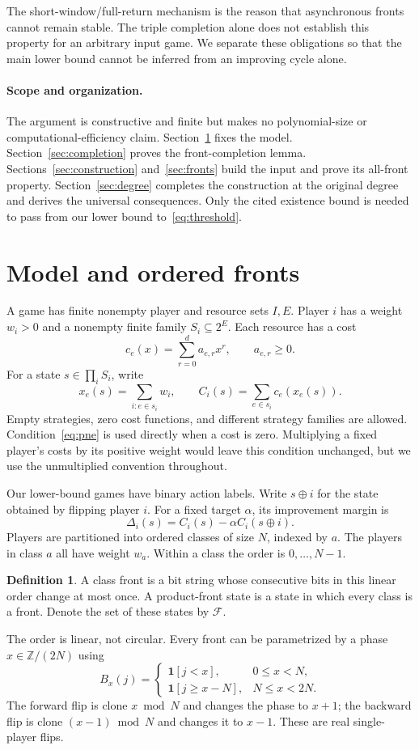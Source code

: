 \documentclass[11pt]{article}
\theoremstyle{definition}
\newtheorem{definition}[theorem]{Definition}
\theoremstyle{remark}
\newcommand{\F}{\mathcal F}
\newcommand{\ind}{\mathbf 1}
\newcommand{\xor}{\mathbin{\oplus}}
\begin{document}
The short-window/full-return mechanism is the reason that asynchronous fronts cannot remain stable. The triple completion alone does not establish this property for an arbitrary input game. We separate these obligations so that the main lower bound cannot be inferred from an improving cycle alone.

\paragraph{Scope and organization.}
The argument is constructive and finite but makes no polynomial-size or computational-efficiency claim. Section~\ref{sec:model} fixes the model. Section~\ref{sec:completion} proves the front-completion lemma. Sections~\ref{sec:construction} and~\ref{sec:fronts} build the input and prove its all-front property. Section~\ref{sec:degree} completes the construction at the original degree and derives the universal consequences. Only the cited existence bound is needed to pass from our lower bound to~\eqref{eq:threshold}.

\section{Model and ordered fronts}\label{sec:model}
A game has finite nonempty player and resource sets $I,E$. Player $i$ has a weight $w_i>0$ and a nonempty finite family $S_i\subseteq2^E$. Each resource has a cost
\[
 c_e(x)=\sum_{r=0}^d a_{e,r}x^r,\qquad a_{e,r}\ge0.
\]
For a state $s\in\prod_iS_i$, write
\[
 x_e(s)=\sum_{i:e\in s_i}w_i,
 \qquad C_i(s)=\sum_{e\in s_i}c_e(x_e(s)).
\]
Empty strategies, zero cost functions, and different strategy families are allowed. Condition~\eqref{eq:pne} is used directly when a cost is zero. Multiplying a fixed player's costs by its positive weight would leave this condition unchanged, but we use the unmultiplied convention throughout.

Our lower-bound games have binary action labels. Write $s\xor i$ for the state obtained by flipping player $i$. For a fixed target $\alpha$, its improvement margin is
\[
 \Delta_i(s)=C_i(s)-\alpha C_i(s\xor i).
\]
Players are partitioned into ordered classes of size $N$, indexed by $a$. The players in class $a$ all have weight $w_a$. Within a class the order is $0,\ldots,N-1$.

\begin{definition}
A class front is a bit string whose consecutive bits in this linear order change at most once. A product-front state is a state in which every class is a front. Denote the set of these states by $\F$.
\end{definition}
The order is linear, not circular. Every front can be parametrized by a phase $x\in\mathbb Z/(2N)$ using
\begin{equation}\label{eq:frontbit}
 B_x(j)=\begin{cases}
 \ind[j<x],&0\le x<N,\\
 \ind[j\ge x-N],&N\le x<2N.
 \end{cases}
\end{equation}
The forward flip is clone $x\bmod N$ and changes the phase to $x+1$; the backward flip is clone $(x-1)\bmod N$ and changes it to $x-1$. These are real single-player flips.
\end{document}
